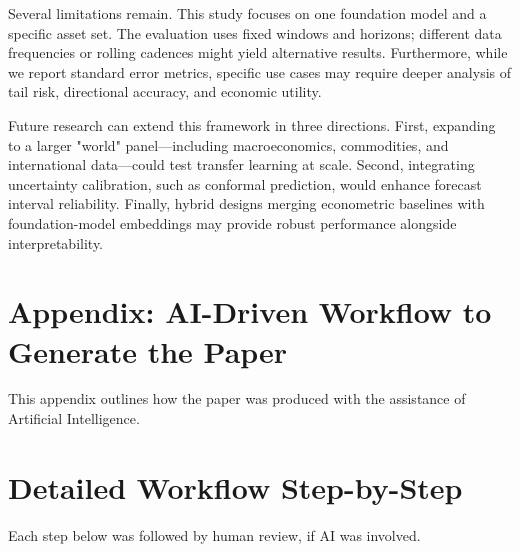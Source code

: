 \documentclass[twocolumn]{article}
\begin{document}
Several limitations remain. This study focuses on one foundation model and a specific asset set. The evaluation uses fixed windows and horizons; different data frequencies or rolling cadences might yield alternative results. Furthermore, while we report standard error metrics, specific use cases may require deeper analysis of tail risk, directional accuracy, and economic utility.

Future research can extend this framework in three directions. First, expanding to a larger "world" panel—including macroeconomics, commodities, and international data—could test transfer learning at scale. Second, integrating uncertainty calibration, such as conformal prediction, would enhance forecast interval reliability. Finally, hybrid designs merging econometric baselines with foundation-model embeddings may provide robust performance alongside interpretability.


\clearpage

\balance



\clearpage
\appendix

\section{Appendix: AI-Driven Workflow to Generate the Paper}
\label{ai_workflow}

This appendix outlines how the paper was produced with the assistance of Artificial Intelligence.


\section*{Detailed Workflow Step-by-Step}

Each step below was followed by human review, if AI was involved. 
\end{document}

